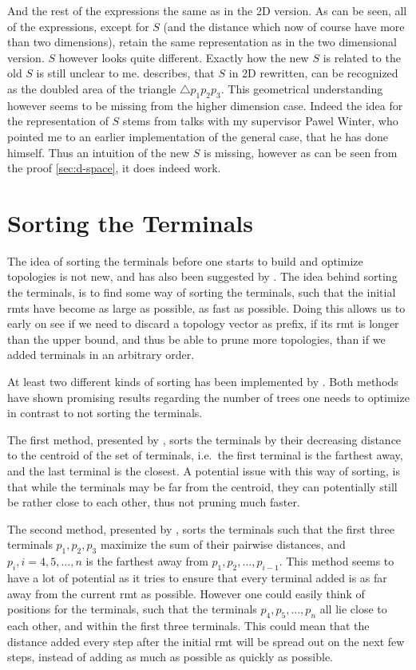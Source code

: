 %
And the rest of the expressions the same as in the 2D version. As can be seen,
all of the expressions, except for $S$ (and the distance which now of course
have more than two dimensions), retain the same representation as in the two
dimensional version. $S$ however looks quite different. Exactly how the new $S$
is related to the old $S$ is still unclear to me. \textcite{uteshev2014}
describes, that $S$ in 2D rewritten, can be recognized as the doubled area of
the triangle $\triangle p_1 p_2 p_3$. This geometrical understanding however
seems to be missing from the higher dimension case. Indeed the idea for the
representation of $S$ stems from talks with my supervisor Pawel Winter, who
pointed me to an earlier implementation of the general case, that he has done
himself. Thus an intuition of the new $S$ is missing, however as can be seen
from the proof \cref{sec:d-space}, it does indeed work.

\section{Sorting the Terminals}
\label{sec:sorting-terminals}

The idea of sorting the terminals before one starts to build and optimize
topologies is not new, and has also been suggested by \textcite{smith1992}. The
idea behind sorting the terminals, is to find some way of sorting the terminals,
such that the initial \acp{rmt} have become as large as possible, as fast as
possible. Doing this allows us to early on see if we need to discard a topology
vector as prefix, if its \ac{rmt} is longer than the upper bound, and thus be
able to prune more topologies, than if we added terminals in an arbitrary order.

At least two different kinds of sorting has been implemented by
\textcite{fonseca2014,vanlaarhoven2013}. Both methods have shown promising
results regarding the number of trees one needs to optimize in contrast to not
sorting the terminals.

The first method, presented by \textcite{vanlaarhoven2013}, sorts the terminals
by their decreasing distance to the centroid of the set of terminals, i.e.\ the
first terminal is the farthest away, and the last terminal is the closest. A
potential issue with this way of sorting, is that while the terminals may be far
from the centroid, they can potentially still be rather close to each other,
thus not pruning much faster.

The second method, presented by \textcite{fonseca2014}, sorts the terminals such
that the first three terminals $p_1, p_2, p_3$ maximize the sum of their
pairwise distances, and $p_i, i = 4, 5, \ldots, n$ is the farthest away from
$p_1, p_2, \ldots, p_{i-1}$. This method seems to have a lot of potential as it
tries to ensure that every terminal added is as far away from the current
\ac{rmt} as possible. However one could easily think of positions for the
terminals, such that the terminals $p_4, p_5, \ldots, p_n$ all lie close to each
other, and within the first three terminals. This could mean that the distance
added every step after the initial \ac{rmt} will be spread out on the next few
steps, instead of adding as much as possible as quickly as possible.

